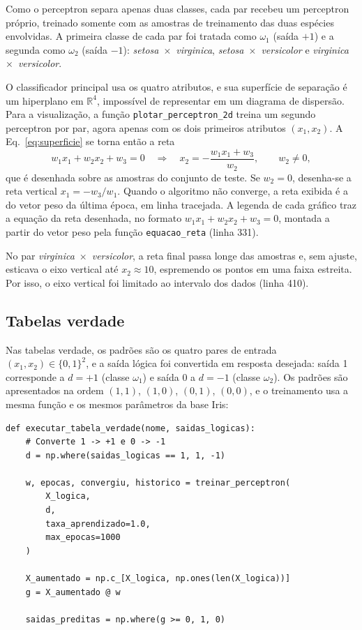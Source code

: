 \documentclass[12pt,a4paper]{article}
\begin{document}
Como o perceptron separa apenas duas classes, cada par recebeu um perceptron próprio, treinado somente com as amostras de treinamento das duas espécies envolvidas. A primeira classe de cada par foi tratada como $\omega_1$ (saída $+1$) e a segunda como $\omega_2$ (saída $-1$): \emph{setosa}~$\times$~\emph{virginica}, \emph{setosa}~$\times$~\emph{versicolor} e \emph{virginica}~$\times$~\emph{versicolor}.

O classificador principal usa os quatro atributos, e sua superfície de separação é um hiperplano em $\mathbb{R}^4$, impossível de representar em um diagrama de dispersão. Para a visualização, a função \texttt{plotar\_perceptron\_2d} treina um segundo perceptron por par, agora apenas com os dois primeiros atributos $(x_1, x_2)$. A Eq.~\eqref{eq:superficie} se torna então a reta
\begin{equation}
  w_1x_1 + w_2x_2 + w_3 = 0
  \quad\Longrightarrow\quad
  x_2 = -\frac{w_1x_1 + w_3}{w_2}, \qquad w_2 \neq 0,
  \label{eq:reta}
\end{equation}
que é desenhada sobre as amostras do conjunto de teste. Se $w_2 = 0$, desenha-se a reta vertical $x_1 = -w_3/w_1$. Quando o algoritmo não converge, a reta exibida é a do vetor peso da última época, em linha tracejada. A legenda de cada gráfico traz a equação da reta desenhada, no formato $w_1x_1 + w_2x_2 + w_3 = 0$, montada a partir do vetor peso pela função \texttt{equacao\_reta} (linha 331).

No par \emph{virginica}~$\times$~\emph{versicolor}, a reta final passa longe das amostras e, sem ajuste, esticava o eixo vertical até $x_2 \approx 10$, espremendo os pontos em uma faixa estreita. Por isso, o eixo vertical foi limitado ao intervalo dos dados (linha 410).

\subsection{Tabelas verdade}

Nas tabelas verdade, os padrões são os quatro pares de entrada $(x_1, x_2) \in \{0,1\}^2$, e a saída lógica foi convertida em resposta desejada: saída 1 corresponde a $d = +1$ (classe $\omega_1$) e saída 0 a $d = -1$ (classe $\omega_2$). Os padrões são apresentados na ordem $(1,1)$, $(1,0)$, $(0,1)$, $(0,0)$, e o treinamento usa a mesma função e os mesmos parâmetros da base Iris:

\begin{lstlisting}[firstnumber=564,title=\texttt{pr4\_perceptron\_iris\_colab.py}]
def executar_tabela_verdade(nome, saidas_logicas):
    # Converte 1 -> +1 e 0 -> -1
    d = np.where(saidas_logicas == 1, 1, -1)

    w, epocas, convergiu, historico = treinar_perceptron(
        X_logica,
        d,
        taxa_aprendizado=1.0,
        max_epocas=1000
    )

    X_aumentado = np.c_[X_logica, np.ones(len(X_logica))]
    g = X_aumentado @ w

    saidas_preditas = np.where(g >= 0, 1, 0)
\end{lstlisting}
\end{document}
